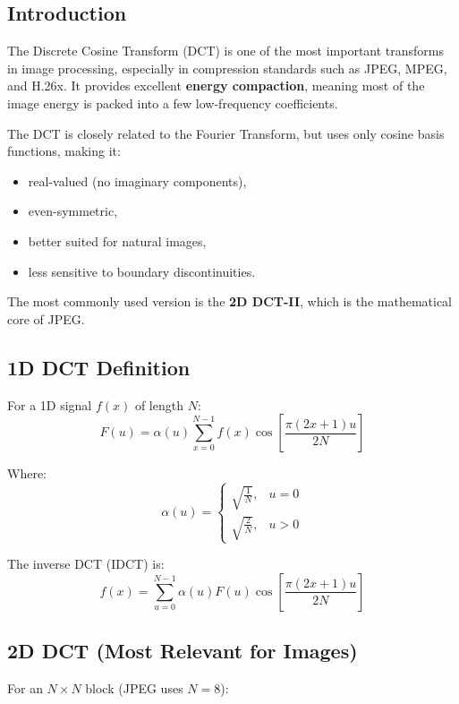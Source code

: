 \documentclass{AnantDocumentation}
\begin{document}
\subsection{Introduction}

The Discrete Cosine Transform (DCT) is one of the most important transforms in image processing, especially in compression standards such as JPEG, MPEG, and H.26x.  
It provides excellent \textbf{energy compaction}, meaning most of the image energy is packed into a few low-frequency coefficients.

The DCT is closely related to the Fourier Transform, but uses only cosine basis functions, making it:

\begin{itemize}
\item real-valued (no imaginary components),
\item even-symmetric,
\item better suited for natural images,
\item less sensitive to boundary discontinuities.
\end{itemize}

The most commonly used version is the \textbf{2D DCT-II}, which is the mathematical core of JPEG.

\subsection{1D DCT Definition}

For a 1D signal $f(x)$ of length $N$:
\begin{equation}
F(u) = \alpha(u) \sum_{x=0}^{N-1} f(x)
\cos\left[\frac{\pi(2x+1)u}{2N}\right]
\end{equation}

Where:
\[
\alpha(u) =
\begin{cases}
\sqrt{\frac{1}{N}}, & u = 0\\[6pt]
\sqrt{\frac{2}{N}}, & u > 0
\end{cases}
\]

The inverse DCT (IDCT) is:
\begin{equation}
f(x) = \sum_{u=0}^{N-1} \alpha(u) F(u)
\cos\left[\frac{\pi(2x+1)u}{2N}\right]
\end{equation}

\subsection{2D DCT (Most Relevant for Images)}

For an $N \times N$ block (JPEG uses $N=8$):
\end{document}
